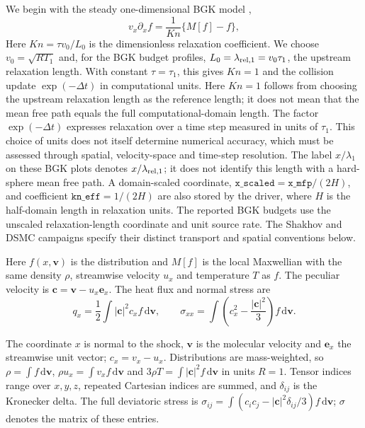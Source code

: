\documentclass[lineno,paper]{JFM-FLM_Au}
\newenvironment{revision}{\nolinenumbers\begin{tcolorbox}[breakable,colback=revisionyellow,colframe=revisionyellow,boxrule=0pt,arc=0pt,left=5pt,right=5pt,top=5pt,bottom=5pt,before skip=6pt,after skip=6pt]\captionsetup{width=\linewidth}}{\end{tcolorbox}\linenumbers}
\newenvironment{revision}{}{}
\newcommand{\Kn}{\mathit{Kn}}
\newcommand{\dd}{\mathrm{d}}
\begin{document}
\begin{revision}
We begin with the steady one-dimensional BGK model \citep{Bhatnagar1954},
\begin{equation}
  v_x\partial_x f = \frac{1}{\Kn}\{M[f]-f\},
  \label{eq:bgk}
\end{equation}
Here $\Kn=\tau v_0/L_0$ is the dimensionless relaxation coefficient. We choose $v_0=\sqrt{RT_1}$ and, for the BGK budget profiles, $L_0=\lambda_{\rm rel,1}=v_0\tau_1$, the upstream relaxation length. With constant $\tau=\tau_1$, this gives $\Kn=1$ and the collision update $\exp(-\Delta t)$ in computational units. Here $\Kn=1$ follows from choosing the upstream relaxation
length as the reference length; it does not mean that the
mean free path equals the full computational-domain length.
The factor $\exp(-\Delta t)$ expresses relaxation over a
time step measured in units of $\tau_1$. This choice of units
does not itself determine numerical accuracy, which must
be assessed through spatial, velocity-space and time-step
resolution. The label $x/\lambda_1$ on these BGK plots denotes $x/\lambda_{\rm rel,1}$; it does not identify this length with a hard-sphere mean free path. A domain-scaled coordinate, $\texttt{x\_scaled}=\texttt{x\_mfp}/(2H)$, and coefficient $\texttt{kn\_eff}=1/(2H)$ are also stored by the driver, where $H$ is the half-domain length in relaxation units. The reported BGK budgets use the unscaled relaxation-length coordinate and unit source rate. The Shakhov and DSMC campaigns specify their distinct transport and spatial conventions below.

Here $f(x,\boldsymbol v)$ is the distribution and $M[f]$ is the local Maxwellian with the same density $\rho$, streamwise velocity $u_x$ and temperature $T$ as $f$.  The peculiar velocity is $\boldsymbol c=\boldsymbol v-u_x\boldsymbol e_x$.  The heat flux and normal stress are
\begin{equation}
  q_x = \frac{1}{2}\int |\boldsymbol c|^2 c_x f\,\dd\boldsymbol v,
  \qquad
  \sigma_{xx}=\int \left(c_x^2-\frac{|\boldsymbol c|^2}{3}\right)f\,\dd\boldsymbol v .
  \label{eq:q_sigma}
\end{equation}

The coordinate $x$ is normal to the shock, $\boldsymbol v$ is the
molecular velocity and $\boldsymbol e_x$ the streamwise unit vector;
$c_x=v_x-u_x$. Distributions are mass-weighted, so
$\rho=\int f\,\dd\boldsymbol v$, $\rho u_x=\int v_xf\,\dd\boldsymbol v$
and $3\rho T=\int|\boldsymbol c|^2f\,\dd\boldsymbol v$ in units $R=1$.
Tensor indices range over $x,y,z$, repeated Cartesian indices are
summed, and $\delta_{ij}$ is the Kronecker delta. The full deviatoric
stress is $\sigma_{ij}=\int(c_ic_j-|\boldsymbol c|^2\delta_{ij}/3)
f\,\dd\boldsymbol v$; $\sigma$ denotes the matrix of these entries.



\end{revision}
\end{document}
